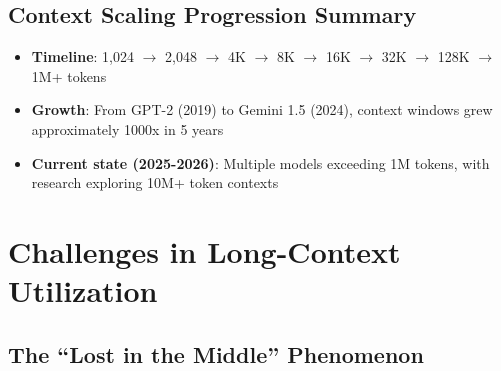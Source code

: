 \documentclass[11pt,letterpaper]{article}
\begin{document}
\subsection{Context Scaling Progression Summary}

\begin{itemize}[leftmargin=*]
    \item \textbf{Timeline}: 1,024 $\rightarrow$ 2,048 $\rightarrow$ 4K $\rightarrow$ 8K $\rightarrow$ 16K $\rightarrow$ 32K $\rightarrow$ 128K $\rightarrow$ 1M+ tokens
    \item \textbf{Growth}: From GPT-2 (2019) to Gemini 1.5 (2024), context windows grew approximately 1000x in 5 years
    \item \textbf{Current state (2025-2026)}: Multiple models exceeding 1M tokens, with research exploring 10M+ token contexts
\end{itemize}

\section{Challenges in Long-Context Utilization}

\subsection{The ``Lost in the Middle'' Phenomenon}
\end{document}
